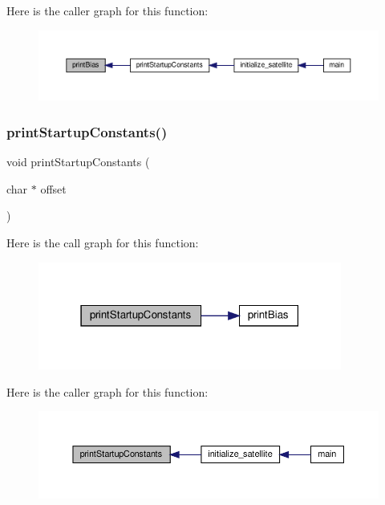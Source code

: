 Here is the caller graph for this function\+:\nopagebreak
\begin{figure}[H]
\begin{center}
\leavevmode
\includegraphics[width=350pt]{i2c-interface_8c_a14f7a41ccc0cdae430b5c7086a34e9c0_icgraph}
\end{center}
\end{figure}
\mbox{\label{i2c-interface_8c_a7584f35073e31c1833be60c696482e9a}} 
\subsubsection{\texorpdfstring{print\+Startup\+Constants()}{printStartupConstants()}}
{\footnotesize\ttfamily void print\+Startup\+Constants (\begin{DoxyParamCaption}\item[{char $\ast$}]{offset }\end{DoxyParamCaption})}

Here is the call graph for this function\+:\nopagebreak
\begin{figure}[H]
\begin{center}
\leavevmode
\includegraphics[width=283pt]{i2c-interface_8c_a7584f35073e31c1833be60c696482e9a_cgraph}
\end{center}
\end{figure}
Here is the caller graph for this function\+:\nopagebreak
\begin{figure}[H]
\begin{center}
\leavevmode
\includegraphics[width=350pt]{i2c-interface_8c_a7584f35073e31c1833be60c696482e9a_icgraph}
\end{center}
\end{figure}
\mbox{\label{i2c-interface_8c_a10fba4cab7c9dfec51afa190dba4c1e9}} 
